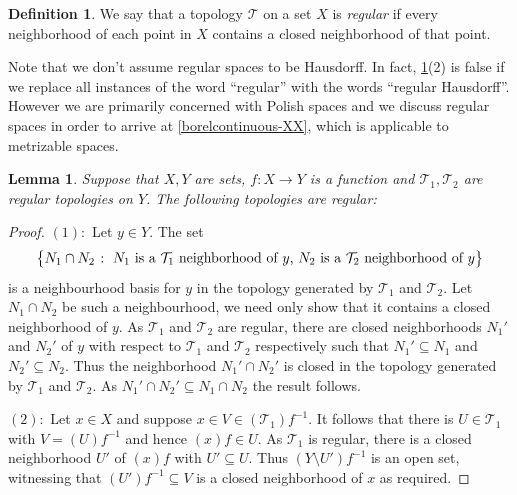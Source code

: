 \documentclass[11pt]{amsart}
\makeatletter
\newtheorem{lemma}[theorem]{Lemma}
\theoremstyle{definition}
\newtheorem{definition}[theorem]{Definition}
\newcommand{\Tau}{\mathcal T}
\newcommand{\makeset}[2]{\left\lbrace #1 \; \colon\;
 \begin{tabular}{@{}l@{}}
   #2
  \end{tabular}
  \right\rbrace}
\makeatother
\begin{document}
\begin{definition}
    We say that a topology \(\Tau\) on a set \(X\) is \emph{regular} if every neighborhood of each point in \(X\) contains a closed neighborhood of that point.
\end{definition}
Note that we don't assume regular spaces to be Hausdorff. In fact, \cref{regfromreg}(2) is false if we replace all instances of the word ``regular'' with the words ``regular Hausdorff''.
However we are primarily concerned with Polish spaces and we discuss regular spaces in order to arrive at \cref{borelcontinuous-XX}, which is applicable to metrizable spaces.
\begin{lemma}\label{regfromreg}
    Suppose that \(X, Y\) are sets, \(f:X\to Y\) is a function and \(\Tau_1, \Tau_2\) are regular topologies on \(Y\). The following topologies are regular:
\end{lemma}
\begin{proof}
    \((1):\) Let \(y\in Y\). The set \[\makeset{N_1\cap N_2}{\(N_1\) is a \(\Tau_1\) neighborhood of \(y\), 
   \(N_2\) is a \(\Tau_2\) neighborhood of \(y\)}\] is a neighbourhood basis for \(y\) in the topology generated by \(\Tau_1\) and \(\Tau_2\).
   Let \(N_1\cap N_2\) be such a neighbourhood, we need only show that it contains a closed neighborhood of \(y\). As \(\Tau_1\) and \(\Tau_2\) are regular, there are closed neighborhoods \(N_1'\) and \(N_2'\) of \(y\) with respect to \(\Tau_1\) and \(\Tau_2\) respectively such that \(N_1'\subseteq N_1\) and \(N_2'\subseteq N_2\). Thus the neighborhood \(N_1'\cap N_2'\) is closed in the topology generated by \(\Tau_1\) and \(\Tau_2\). As \(N_1'\cap N_2'\subseteq N_1\cap N_2\) the result follows.

   \((2):\) Let \(x\in X\) and suppose \(x\in V\in (\Tau_1)f^{-1}\). It follows that there is \(U\in \Tau_1\) with \(V=(U)f^{-1}\) and hence \((x)f\in U\). As \(\Tau_1\) is regular, there is a closed neighborhood \(U'\) of \((x)f\) with \(U'\subseteq U\). Thus $(Y\setminus U')f^{-1}$ is an open set, witnessing that \((U')f^{-1}\subseteq V\) is a closed neighborhood of \(x\) as required.
\end{proof}
\end{document}
